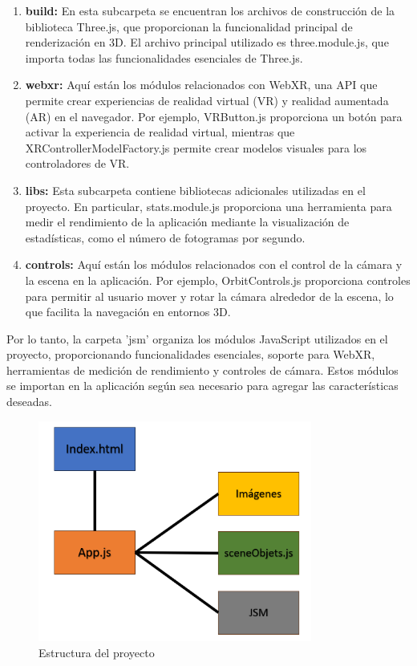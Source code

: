 \documentclass[a4paper, 12pt]{book}
\begin{document}
\begin{itemize}
  \begin{enumerate}
    \item \textbf{build:} En esta subcarpeta se encuentran los archivos de construcción de la biblioteca Three.js, 
    que proporcionan la funcionalidad principal de renderización en 3D. El archivo principal utilizado es three.module.js, 
    que importa todas las funcionalidades esenciales de Three.js.
    \item \textbf{webxr:} Aquí están los módulos relacionados con WebXR, una API que permite crear experiencias de realidad virtual (VR) y realidad aumentada (AR) en el navegador. 
    Por ejemplo, VRButton.js proporciona un botón para activar la experiencia de realidad virtual, mientras que XRControllerModelFactory.js 
    permite crear modelos visuales para los controladores de VR.
    \item \textbf{libs:} Esta subcarpeta contiene bibliotecas adicionales utilizadas en el proyecto. 
    En particular, stats.module.js proporciona una herramienta para medir el rendimiento de la aplicación 
    mediante la visualización de estadísticas, como el número de fotogramas por segundo.
    \item \textbf{controls:} Aquí están los módulos relacionados con el control de la cámara y la escena en la aplicación. 
    Por ejemplo, OrbitControls.js proporciona controles para permitir al usuario mover y rotar la cámara 
    alrededor de la escena, lo que facilita la navegación en entornos 3D.
  \end{enumerate}

  Por lo tanto, la carpeta 'jsm' organiza los módulos JavaScript utilizados en el proyecto, 
  proporcionando funcionalidades esenciales, soporte para WebXR, herramientas de medición de rendimiento y controles de cámara. 
  Estos módulos se importan en la aplicación según sea necesario para agregar las características deseadas.

\end{itemize}

\begin{figure}
  \centering
  \includegraphics[width=9cm, keepaspectratio]{img/estructura.png}
  \caption{Estructura del proyecto}
  \label{fig:arquitectura}
\end{figure}
\end{document}
